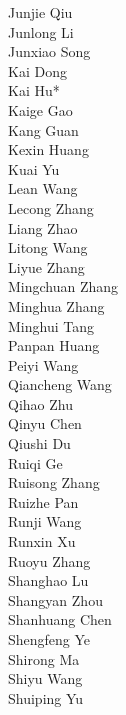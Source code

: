 \documentclass[11pt, a4paper, logo, copyright, nonumbering]{deepseek}
\begin{document}
\begin{CJK*}{UTF8}{gbsn}
\begin{multicols}{2}
\color{damaiblue} Junjie Qiu \\
\color{damaiblue} Junlong Li \\
\color{damaiblue} Junxiao Song \\
\color{damaiblue} Kai Dong \\
\color{damaiblue} Kai Hu* \\
\color{damaiblue} Kaige Gao \\
\color{damaiblue} Kang Guan \\
\color{damaiblue} Kexin Huang \\
\color{damaiblue} Kuai Yu \\
\color{damaiblue} Lean Wang \\
\color{damaiblue} Lecong Zhang \\
\color{damaiblue} Liang Zhao \\
\color{damaiblue} Litong Wang \\
\color{damaiblue} Liyue Zhang \\
\color{damaiblue} Mingchuan Zhang \\
\color{damaiblue} Minghua Zhang \\
\color{damaiblue} Minghui Tang \\
\color{damaiblue} Panpan Huang \\
\color{damaiblue} Peiyi Wang \\
\color{damaiblue} Qiancheng Wang \\
\color{damaiblue} Qihao Zhu \\
\color{damaiblue} Qinyu Chen \\
\color{damaiblue} Qiushi Du \\
\color{damaiblue} Ruiqi Ge \\
\color{damaiblue} Ruisong Zhang \\
\color{damaiblue} Ruizhe Pan \\
\color{damaiblue} Runji Wang \\
\color{damaiblue} Runxin Xu \\
\color{damaiblue} Ruoyu Zhang \\
\color{damaiblue} Shanghao Lu \\
\color{damaiblue} Shangyan Zhou \\
\color{damaiblue} Shanhuang Chen \\
\color{damaiblue} Shengfeng Ye \\
\color{damaiblue} Shirong Ma \\
\color{damaiblue} Shiyu Wang \\
\color{damaiblue} Shuiping Yu \\

\end{multicols}
\end{CJK*}
\end{document}
